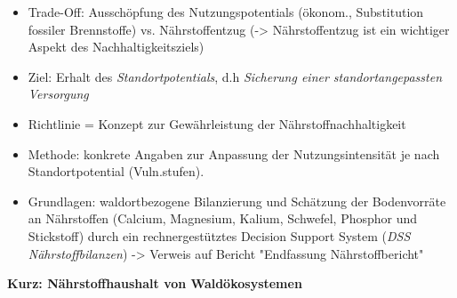 \documentclass{article}
\begin{document}
\begin{itemize}
	
	\item Trade-Off: Ausschöpfung des Nutzungspotentials (ökonom., Substitution fossiler Brennstoffe) vs. Nährstoffentzug (-> Nährstoffentzug ist ein wichtiger Aspekt des Nachhaltigkeitsziels)
	
	\item Ziel: Erhalt des \textit{Standortpotentials}, d.h \textit{Sicherung einer standortangepassten Versorgung}
	
	\item Richtlinie = Konzept zur Gewährleistung der Nährstoffnachhaltigkeit
	
	\item Methode: konkrete Angaben zur Anpassung der Nutzungsintensität je nach Standortpotential (Vuln.stufen).
	
	\item Grundlagen: waldortbezogene Bilanzierung und Schätzung der Bodenvorräte an Nährstoffen (Calcium, Magnesium, Kalium, Schwefel, Phosphor und Stickstoff) durch ein rechnergestütztes Decision Support System (\textit{DSS Nährstoffbilanzen}) -> Verweis auf Bericht "Endfassung Nährstoffbericht"
	
\end{itemize} 


\textbf{Kurz: Nährstoffhaushalt von Waldökosystemen}\\
\end{document}
